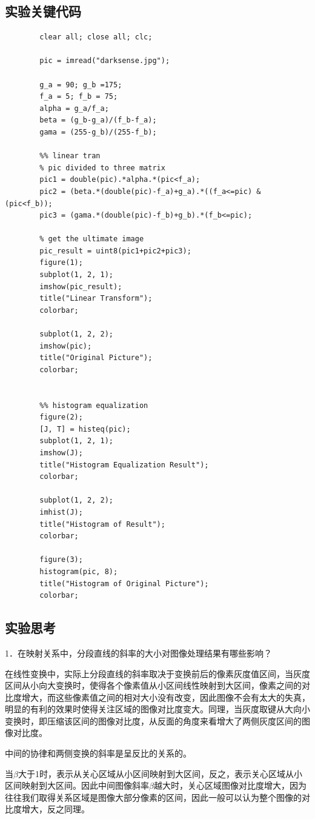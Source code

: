 \documentclass[UTF8]{article} %
\begin{document}
	\subsection{实验关键代码}
	\begin{lstlisting}[style=Matlab-editor]
		% clear
		clear all; close all; clc;
		
		pic = imread("darksense.jpg");
		
		g_a = 90; g_b =175;
		f_a = 5; f_b = 75;
		alpha = g_a/f_a;
		beta = (g_b-g_a)/(f_b-f_a);
		gama = (255-g_b)/(255-f_b);
		
		%% linear tran
		% pic divided to three matrix
		pic1 = double(pic).*alpha.*(pic<f_a);
		pic2 = (beta.*(double(pic)-f_a)+g_a).*((f_a<=pic) & (pic<f_b));
		pic3 = (gama.*(double(pic)-f_b)+g_b).*(f_b<=pic);
		
		% get the ultimate image
		pic_result = uint8(pic1+pic2+pic3);
		figure(1);
		subplot(1, 2, 1);
		imshow(pic_result);
		title("Linear Transform");
		colorbar;
		
		subplot(1, 2, 2);
		imshow(pic);
		title("Original Picture");
		colorbar;
		
		
		%% histogram equalization
		figure(2);
		[J, T] = histeq(pic);
		subplot(1, 2, 1);
		imshow(J);
		title("Histogram Equalization Result");
		colorbar;
		
		subplot(1, 2, 2);
		imhist(J);
		title("Histogram of Result");
		colorbar;
		
		figure(3);
		histogram(pic, 8);
		title("Histogram of Original Picture");
		colorbar;
	\end{lstlisting}

	\subsection{实验思考}
	1．在映射关系中，分段直线的斜率的大小对图像处理结果有哪些影响？
	
	在线性变换中，实际上分段直线的斜率取决于变换前后的像素灰度值区间，当灰度区间从小向大变换时，使得各个像素值从小区间线性映射到大区间，像素之间的对比度增大，而这些像素值之间的相对大小没有改变，因此图像不会有太大的失真，明显的有利的效果时使得关注区域的图像对比度变大。同理，当灰度取键从大向小变换时，即压缩该区间的图像对比度，从反面的角度来看增大了两侧灰度区间的图像对比度。
	
	中间的协律和两侧变换的斜率是呈反比的关系的。
	
	当$\beta$大于1时，表示从关心区域从小区间映射到大区间，反之，表示关心区域从小区间映射到大区间。因此中间图像斜率$\beta$越大时，关心区域图像对比度增大，因为往往我们取得关系区域是图像大部分像素的区间，因此一般可以认为整个图像的对比度增大，反之同理。
	
\end{document}
